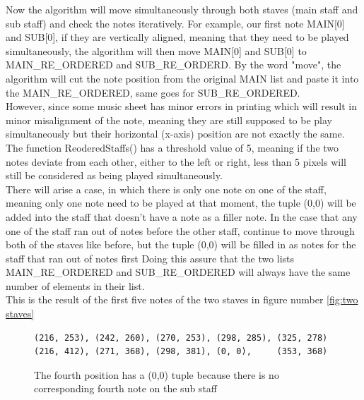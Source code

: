 \documentclass[a4paper,12pt]{report}
\begin{document}
Now the algorithm will move simultaneously through both staves (main staff and sub staff) and check the
notes iteratively. For example, our first note MAIN[0] and SUB[0], if they
are vertically aligned, meaning that they need to be played simultaneously,
the algorithm will then move MAIN[0] and SUB[0] to MAIN\_RE\_ORDERED and
SUB\_RE\_ORDERD. By the word "move", the algorithm will cut the note
position from the original MAIN list and paste it into the
MAIN\_RE\_ORDERED, same goes for SUB\_RE\_ORDERED.\\

However, since some music sheet has  minor errors in printing which will result in minor
misalignment of the note, meaning they are still supposed to be play
simultaneously but their horizontal (x-axis) position are not exactly the
same. The function ReoderedStaffs() has a threshold value of 5, meaning if
the two notes deviate from each other, either to the left or right, less than
5 pixels will still be considered as being played simultaneously.\\

There will arise a case, in which there is only one note on one of the staff, meaning
only one note need to be played at that moment, the tuple (0,0) will be added
into the staff that doesn't have a note as a filler note. In the case that any one of the
staff ran out of notes before the other staff, continue to move through both of the
staves like before, but the tuple (0,0) will be filled in as notes for the staff that ran out of notes first
Doing this assure that the two lists MAIN\_RE\_ORDERED and SUB\_RE\_ORDERED will
always have the same number of elements in their list.\\

\noindent This is the result of the first five notes of the two staves in figure number
\ref{fig:two staves}\\

\begin{figure}[H]
\begin{verbatim}
(216, 253), (242, 260), (270, 253), (298, 285), (325, 278)
(216, 412), (271, 368), (298, 381), (0, 0),     (353, 368)
\end{verbatim}
\caption{The fourth position has a (0,0) tuple because there is no corresponding fourth
note on the sub staff}
\end{figure}
\end{document}
